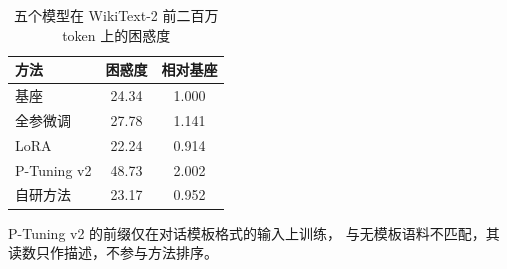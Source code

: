 \begin{table}[htbp]
\centering
\caption{五个模型在 WikiText-2 前二百万 token 上的困惑度}
\label{tab:ppl}
\begin{tabular}{lSS}
\toprule
方法 & {困惑度} & {相对基座} \\
\midrule
基座 & 24.34 & 1.000 \\
全参微调 & 27.78 & 1.141 \\
LoRA & 22.24 & 0.914 \\
P-Tuning v2 & 48.73 & 2.002 \\
自研方法 & 23.17 & 0.952 \\
\bottomrule
\end{tabular}
\begin{minipage}{\linewidth}
\vspace{0.3em}\footnotesize P-Tuning v2 的前缀仅在对话模板格式的输入上训练，
与无模板语料不匹配，其读数只作描述，不参与方法排序。
\end{minipage}
\end{table}
